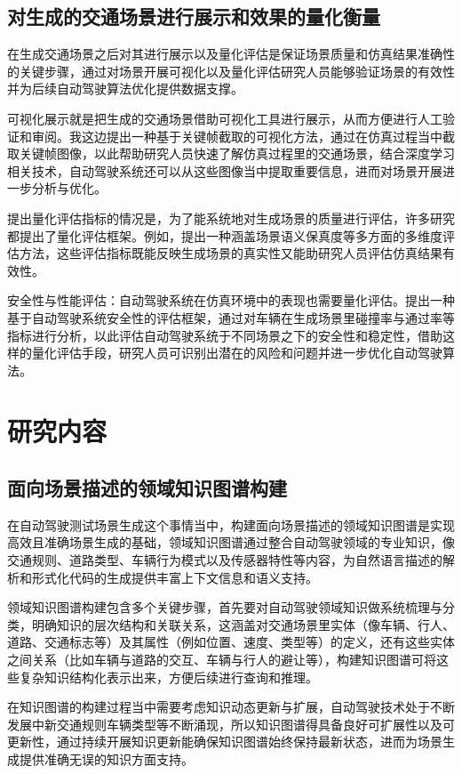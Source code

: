 	\subsection{对生成的交通场景进行展示和效果的量化衡量}
	在生成交通场景之后对其进行展示以及量化评估是保证场景质量和仿真结果准确性的关键步骤，通过对场景开展可视化以及量化评估研究人员能够验证场景的有效性并为后续自动驾驶算法优化提供数据支撑。
	
	可视化展示就是把生成的交通场景借助可视化工具进行展示，从而方便进行人工验证和审阅。我这边提出一种基于关键帧截取的可视化方法，通过在仿真过程当中截取关键帧图像，以此帮助研究人员快速了解仿真过程里的交通场景，结合深度学习相关技术，自动驾驶系统还可以从这些图像当中提取重要信息，进而对场景开展进一步分析与优化。
	
提出量化评估指标的情况是，为了能系统地对生成场景的质量进行评估，许多研究都提出了量化评估框架。例如，提出一种涵盖场景语义保真度等多方面的多维度评估方法，这些评估指标既能反映生成场景的真实性又能助研究人员评估仿真结果有效性。
	
	安全性与性能评估：自动驾驶系统在仿真环境中的表现也需要量化评估。提出一种基于自动驾驶系统安全性的评估框架，通过对车辆在生成场景里碰撞率与通过率等指标进行分析，以此评估自动驾驶系统于不同场景之下的安全性和稳定性，借助这样的量化评估手段，研究人员可识别出潜在的风险和问题并进一步优化自动驾驶算法。
	
	\section{研究内容}
	\subsection{面向场景描述的领域知识图谱构建}
在自动驾驶测试场景生成这个事情当中，构建面向场景描述的领域知识图谱是实现高效且准确场景生成的基础，领域知识图谱通过整合自动驾驶领域的专业知识\cite{Wang2021advSim}，像交通规则、道路类型、车辆行为模式以及传感器特性等内容，为自然语言描述的解析和形式化代码的生成提供丰富上下文信息和语义支持。
	
领域知识图谱构建包含多个关键步骤\cite{Xu2022Safebench}，首先要对自动驾驶领域知识做系统梳理与分类，明确知识的层次结构和关联关系，这涵盖对交通场景里实体（像车辆、行人、道路、交通标志等）及其属性（例如位置、速度、类型等）的定义，还有这些实体之间关系（比如车辆与道路的交互、车辆与行人的避让等），构建知识图谱可将这些复杂知识结构化表示出来，方便后续进行查询和推理。
	
在知识图谱的构建过程当中需要考虑知识动态更新与扩展\cite{Yang2020SurfelGAN}，自动驾驶技术处于不断发展中新交通规则车辆类型等不断涌现，所以知识图谱得具备良好可扩展性以及可更新性，通过持续开展知识更新能确保知识图谱始终保持最新状态，进而为场景生成提供准确无误的知识方面支持。
	
